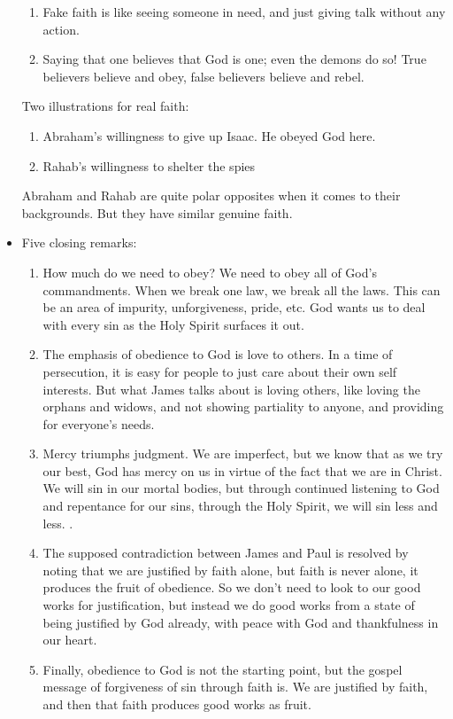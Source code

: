 \begin{itemize}
{\begin{enumerate}
    \item Fake faith is like seeing someone in need, and just giving talk without any action.
    \item Saying that one believes that God is one; even the demons do so! True believers believe and obey, false believers believe and rebel.
  \end{enumerate}
  Two illustrations for real faith:
  \begin{enumerate}
    \item Abraham’s willingness to give up Isaac. He obeyed God here. 
    \item Rahab’s willingness to shelter the spies 
  \end{enumerate}
  Abraham and Rahab are quite polar opposites when it comes to their backgrounds. But they have similar genuine faith.}
  \item{Five closing remarks:
  \begin{enumerate}
    \item How much do we need to obey? We need to obey all of God’s commandments. When we break one law, we break all the laws. This can be an area of impurity, unforgiveness, pride, etc. God wants us to deal with every sin as the Holy Spirit surfaces it out.
    \item The emphasis of obedience to God is love to others. In a time of persecution, it is easy for people to just care about their own self interests. But what James talks about is loving others, like loving the orphans and widows, and not showing partiality to anyone, and providing for everyone’s needs. 
    \item Mercy triumphs judgment. We are imperfect, but we know that as we try our best, God has mercy on us in virtue of the fact that we are in Christ. We will sin in our mortal bodies, but through continued listening to God and repentance for our sins, through the Holy Spirit, we will sin less and less. .
    \item The supposed contradiction between James and Paul is resolved by noting that we are justified by faith alone, but faith is never alone, it produces the fruit of obedience. So we don’t need to look to our good works for justification, but instead we do good works from a state of being justified by God already, with peace with God and thankfulness in our heart.
    \item Finally, obedience to God is not the starting point, but the gospel message of forgiveness of sin through faith is. We are justified by faith, and then that faith produces good works as fruit.  
  \end{enumerate}}
\end{itemize}